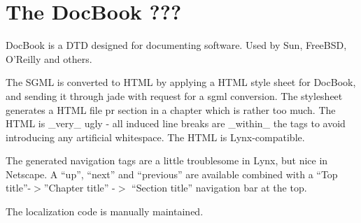 
\chapter{The DocBook ???}

DocBook is a DTD designed for documenting software.  Used by Sun,
FreeBSD, O'Reilly and others.

The SGML is converted to HTML by applying a HTML style sheet for
DocBook, and sending it through jade with request for a sgml
conversion.  The stylesheet generates a HTML file pr section in a
chapter which is rather too much.  The HTML is \_very\_ ugly - all
induced line breaks are \_within\_ the tags to avoid introducing any
artificial whitespace.  The HTML is Lynx-compatible.

The generated navigation tags are a little troublesome in Lynx, but
nice in Netscape.  A ``up'', ``next'' and ``previous'' are available
combined with a ``Top title''-$>$''Chapter title'' -$>$ ``Section title''
navigation bar at the top.

The localization code is manually maintained.



